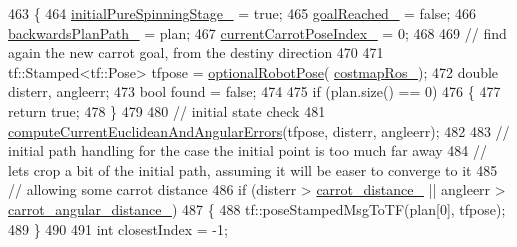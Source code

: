 \begin{DoxyCode}
463         \{
464             \hyperlink{classcl__move__base__z_1_1backward__local__planner_1_1BackwardLocalPlanner_aa0e2b0589fce0bb228eb87751528e822}{initialPureSpinningStage\_} = \textcolor{keyword}{true};
465             \hyperlink{classcl__move__base__z_1_1backward__local__planner_1_1BackwardLocalPlanner_ad443c52ef585a8eab0364f0909222f51}{goalReached\_} = \textcolor{keyword}{false};
466             \hyperlink{classcl__move__base__z_1_1backward__local__planner_1_1BackwardLocalPlanner_ad9cde5c85f782cab2ddb4030e3c3f2cf}{backwardsPlanPath\_} = plan;
467             \hyperlink{classcl__move__base__z_1_1backward__local__planner_1_1BackwardLocalPlanner_a2e8f2b78bc97f27c5fa431f3af2261ed}{currentCarrotPoseIndex\_} = 0;
468 
469             \textcolor{comment}{// find again the new carrot goal, from the destiny direction}
470 
471             tf::Stamped<tf::Pose> tfpose = \hyperlink{namespacecl__move__base__z_1_1backward__local__planner_afd5bb2a0d144f7b89f4215fbcb1fbe69}{optionalRobotPose}(
      \hyperlink{classcl__move__base__z_1_1backward__local__planner_1_1BackwardLocalPlanner_a4136268882a105d9e06e173d85d5c0dc}{costmapRos\_});
472             \textcolor{keywordtype}{double} disterr, angleerr;
473             \textcolor{keywordtype}{bool} found = \textcolor{keyword}{false};
474 
475             \textcolor{keywordflow}{if} (plan.size() == 0)
476             \{
477                 \textcolor{keywordflow}{return} \textcolor{keyword}{true};
478             \}
479 
480             \textcolor{comment}{// initial state check}
481             \hyperlink{classcl__move__base__z_1_1backward__local__planner_1_1BackwardLocalPlanner_a843f030138afe0a28cf11a729fa67383}{computeCurrentEuclideanAndAngularErrors}(tfpose, disterr,
       angleerr);
482 
483             \textcolor{comment}{// initial path handling for the case the initial point is too much far away}
484             \textcolor{comment}{// lets crop a bit of the initial path, assuming it will be easer to converge to it}
485             \textcolor{comment}{// allowing some carrot distance}
486             \textcolor{keywordflow}{if} (disterr > \hyperlink{classcl__move__base__z_1_1backward__local__planner_1_1BackwardLocalPlanner_a0bbb80ce5bae865c4322869422803296}{carrot\_distance\_} || angleerr > 
      \hyperlink{classcl__move__base__z_1_1backward__local__planner_1_1BackwardLocalPlanner_a63e30befa09c4a67cf55086923b760c7}{carrot\_angular\_distance\_})
487             \{
488                 tf::poseStampedMsgToTF(plan[0], tfpose);
489             \}
490 
491             \textcolor{keywordtype}{int} closestIndex = -1;

\end{DoxyCode}
